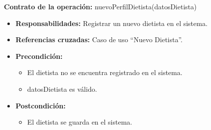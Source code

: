 \textbf{Contrato de la operación:} nuevoPerfilDietista(datosDietista)
\begin{itemize}
\item \textbf{Responsabilidades:} Registrar un nuevo dietista en el sistema.
\item \textbf{Referencias cruzadas:} Caso de uso ``Nuevo Dietista''.
\item \textbf{Precondición:}
\begin{itemize}
\item El dietista no se encuentra registrado en el sistema.
\item datosDietista es válido.
\end{itemize}
\item \textbf{Postcondición:}
\begin{itemize}
\item El dietista se guarda en el sistema.
\end{itemize}
\end{itemize}

